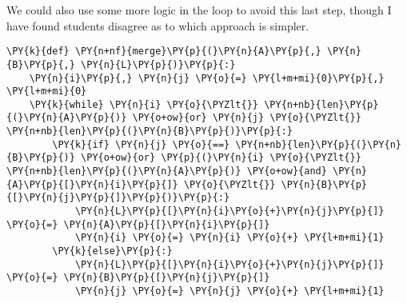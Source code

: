We could also use some more logic in the loop to avoid this last step, though I have found students disagree as to which approach is simpler.

\begin{Verbatim}[commandchars=\\\{\}]
\PY{k}{def} \PY{n+nf}{merge}\PY{p}{(}\PY{n}{A}\PY{p}{,} \PY{n}{B}\PY{p}{,} \PY{n}{L}\PY{p}{)}\PY{p}{:}   
    \PY{n}{i}\PY{p}{,} \PY{n}{j} \PY{o}{=} \PY{l+m+mi}{0}\PY{p}{,} \PY{l+m+mi}{0}
    \PY{k}{while} \PY{n}{i} \PY{o}{\PYZlt{}} \PY{n+nb}{len}\PY{p}{(}\PY{n}{A}\PY{p}{)} \PY{o+ow}{or} \PY{n}{j} \PY{o}{\PYZlt{}} \PY{n+nb}{len}\PY{p}{(}\PY{n}{B}\PY{p}{)}\PY{p}{:}
        \PY{k}{if} \PY{n}{j} \PY{o}{==} \PY{n+nb}{len}\PY{p}{(}\PY{n}{B}\PY{p}{)} \PY{o+ow}{or} \PY{p}{(}\PY{n}{i} \PY{o}{\PYZlt{}} \PY{n+nb}{len}\PY{p}{(}\PY{n}{A}\PY{p}{)} \PY{o+ow}{and} \PY{n}{A}\PY{p}{[}\PY{n}{i}\PY{p}{]} \PY{o}{\PYZlt{}} \PY{n}{B}\PY{p}{[}\PY{n}{j}\PY{p}{]}\PY{p}{)}\PY{p}{:}
            \PY{n}{L}\PY{p}{[}\PY{n}{i}\PY{o}{+}\PY{n}{j}\PY{p}{]} \PY{o}{=} \PY{n}{A}\PY{p}{[}\PY{n}{i}\PY{p}{]}
            \PY{n}{i} \PY{o}{=} \PY{n}{i} \PY{o}{+} \PY{l+m+mi}{1}
        \PY{k}{else}\PY{p}{:}
            \PY{n}{L}\PY{p}{[}\PY{n}{i}\PY{o}{+}\PY{n}{j}\PY{p}{]} \PY{o}{=} \PY{n}{B}\PY{p}{[}\PY{n}{j}\PY{p}{]}
            \PY{n}{j} \PY{o}{=} \PY{n}{j} \PY{o}{+} \PY{l+m+mi}{1}
\end{Verbatim}


